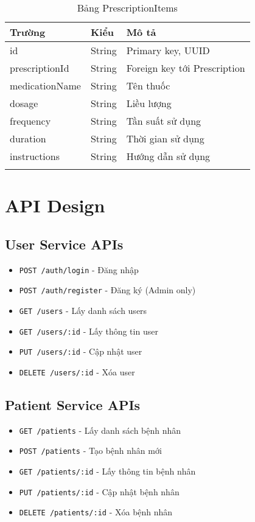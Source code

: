 \documentclass[12pt,a4paper]{report}
\begin{document}
\begin{longtable}{|p{3cm}|p{2cm}|p{8cm}|}
\hline
\textbf{Trường} & \textbf{Kiểu} & \textbf{Mô tả} \\
\hline
id & String & Primary key, UUID \\
\hline
prescriptionId & String & Foreign key tới Prescription \\
\hline
medicationName & String & Tên thuốc \\
\hline
dosage & String & Liều lượng \\
\hline
frequency & String & Tần suất sử dụng \\
\hline
duration & String & Thời gian sử dụng \\
\hline
instructions & String & Hướng dẫn sử dụng \\
\hline
\caption{Bảng PrescriptionItems}
\end{longtable}

\section{API Design}

\subsection{User Service APIs}
\begin{itemize}
    \item \texttt{POST /auth/login} - Đăng nhập
    \item \texttt{POST /auth/register} - Đăng ký (Admin only)
    \item \texttt{GET /users} - Lấy danh sách users
    \item \texttt{GET /users/:id} - Lấy thông tin user
    \item \texttt{PUT /users/:id} - Cập nhật user
    \item \texttt{DELETE /users/:id} - Xóa user
\end{itemize}

\subsection{Patient Service APIs}
\begin{itemize}
    \item \texttt{GET /patients} - Lấy danh sách bệnh nhân
    \item \texttt{POST /patients} - Tạo bệnh nhân mới
    \item \texttt{GET /patients/:id} - Lấy thông tin bệnh nhân
    \item \texttt{PUT /patients/:id} - Cập nhật bệnh nhân
    \item \texttt{DELETE /patients/:id} - Xóa bệnh nhân
\end{itemize}
\end{document}
